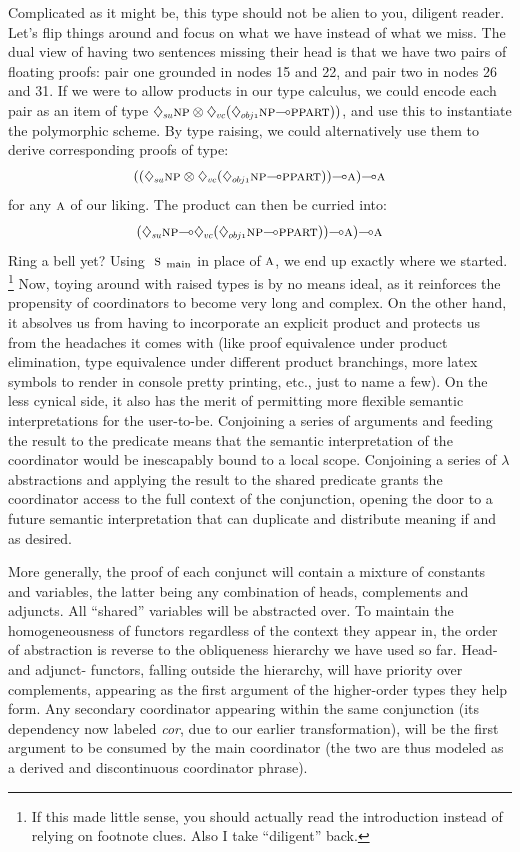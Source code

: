 Complicated as it might be, this type should not be alien to you, diligent reader.
Let's flip things around and focus on what we have instead of what we miss.
The dual view of having two sentences missing their head is that we have two pairs of floating proofs: pair one grounded in nodes 15 and 22, and pair two in nodes 26 and 31.
If we were to allow products in our type calculus, we could encode each pair as an item of type $\ddia{su}\np[s]\otimes\ddia{vc}(\ddia{obj1}\np[s]\li\ppart[s]))$, and use this to instantiate the polymorphic scheme.
By type raising, we could alternatively use them to derive corresponding proofs of type:
\begin{equation*}
((\ddia{su}\np[s]\otimes\ddia{vc}(\ddia{obj1}\np[s]\li\ppart[s]))\li\smallgtype{a})\li\smallgtype{a}
\end{equation*}
for any $\textsc{\normalfont\textsc{a}}$ of our liking.
The product can then be curried into:
\begin{equation*}
(\ddia{su}\np[s]\li\ddia{vc}(\ddia{obj1}\np[s]\li\ppart[s]))\li\smallgtype{a})\li\smallgtype{a}
\end{equation*}
Ring a bell yet?
Using $\smain[s]$ in place of $\textsc{\normalfont\textsc{a}}$, we end up exactly where we started.%
	\footnote{If this made little sense, you should actually read the introduction instead of relying on footnote clues.
	Also I take ``diligent'' back.}
Now, toying around with raised types is by no means ideal, as it reinforces the propensity of coordinators to become very long and complex.
On the other hand, it absolves us from having to incorporate an explicit product and protects us from the headaches it comes with (like proof equivalence under product elimination, type equivalence under different product branchings, more latex symbols to render in console pretty printing, etc., just to name a few).
On the less cynical side, it also has the merit of permitting more flexible semantic interpretations for the user-to-be.
Conjoining a series of arguments and feeding the result to the predicate means that the semantic interpretation of the coordinator would be inescapably bound to a local scope.
Conjoining a series of $\lambda$ abstractions and applying the result to the shared predicate grants the coordinator access to the full context of the conjunction, opening the door to a future semantic interpretation that can duplicate and distribute meaning if and as desired.

More generally, the proof of each conjunct will contain a mixture of constants and variables, the latter being any combination of heads, complements and adjuncts.
All ``shared'' variables will be abstracted over.
To maintain the homogeneousness of functors regardless of the context they appear in, the order of abstraction is reverse to the obliqueness hierarchy we have used so far.
Head- and adjunct- functors, falling outside the hierarchy, will have priority over complements, appearing as the first argument of the higher-order types they help form.
Any secondary coordinator appearing within the same conjunction (its dependency now labeled \textit{cor}, due to our earlier transformation), will be the first argument to be consumed by the main coordinator (the two are thus modeled as a derived and discontinuous coordinator phrase).

